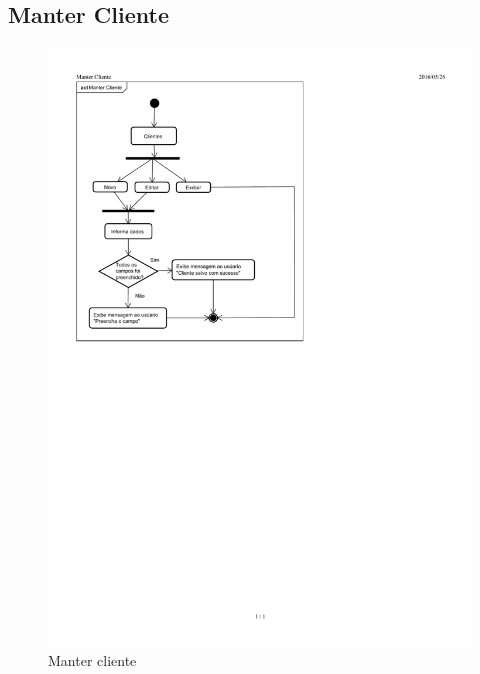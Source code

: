 \documentclass[chapter=TITLE,12pt,oneside,a4paper,english,french,sumario=tradicional,spanish,brazil,]{abntex2}
\begin{document}
\subsection{Manter Cliente}
\begin{figure}[h]\centering
	\includegraphics[scale=1.54]{cliente.pdf}\caption{Manter cliente}
\end{figure}

\newpage
\end{document}
